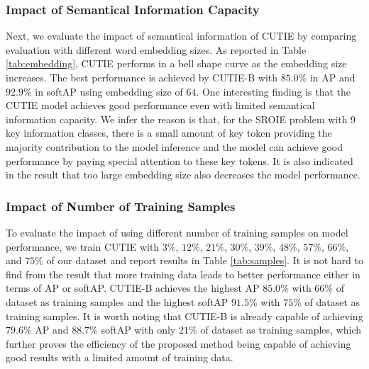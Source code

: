 \documentclass[10pt,twocolumn,letterpaper]{article}
\begin{document}
\subsubsection{Impact of Semantical Information Capacity}
\label{parameters}
Next, we evaluate the impact of semantical information of CUTIE by comparing evaluation with different word embedding sizes. As reported in Table \ref{tab:embedding}, CUTIE performs in a bell shape curve as the embedding size increases. The best performance is achieved by CUTIE-B with $85.0\%$ in AP and $92.9\%$ in softAP using embedding size of $64$. One interesting finding is that the CUTIE model achieves good performance even with limited semantical information capacity. We infer the reason is that, for the SROIE problem with 9 key information classes, there is a small amount of key token providing the majority contribution to the model inference and the model can achieve good performance by paying special attention to these key tokens. It is also indicated in the result that too large embedding size also decreases the model performance. 

\subsubsection{Impact of Number of Training Samples}
To evaluate the impact of using different number of training samples on model performance, we train CUTIE with $3\%$, $12\%$, $21\%$, $30\%$, $39\%$, $48\%$, $57\%$, $66\%$, and $75\%$ of our dataset and report results in Table \ref{tab:samples}. It is not hard to find from the result that more training data leads to better performance either in terms of AP or softAP. CUTIE-B achieves the highest AP $85.0\%$ with $66\%$ of dataset as training samples and the highest softAP $91.5\%$ with $75\%$ of dataset as training samples. It is worth noting that CUTIE-B is already capable of achieving $79.6\%$ AP and $88.7\%$ softAP with only $21\%$ of dataset as training samples, which further proves the efficiency of the proposed method being capable of achieving good results with a limited amount of training data.
\end{document}
